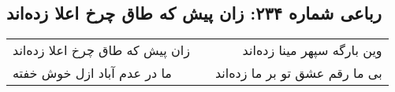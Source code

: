 \begin{center}
\section*{رباعی شماره ۲۳۴: زان پیش که طاق چرخ اعلا زده‌اند}
\label{sec:sh234}
\begin{longtable}{l p{0.5cm} r}
زان پیش که طاق چرخ اعلا زده‌اند
&&
وین بارگه سپهر مینا زده‌اند
\\
ما در عدم آباد ازل خوش خفته
&&
بی ما رقم عشق تو بر ما زده‌اند
\\
\end{longtable}
\end{center}
